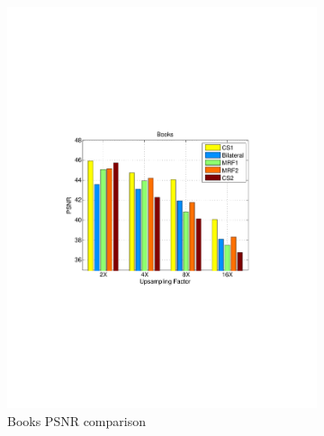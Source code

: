 \documentclass[preprint,10pt,5p,times,twocolumn]{elsarticle}
\begin{document}
\begin{figure}
\centering
\begin{subfigure}[b]{0.24\textwidth}
\includegraphics[width=\textwidth]{fig_exp1_books.pdf}
\caption*{Books PSNR comparison}
\end{subfigure}
\begin{subfigure}[b]{0.24\textwidth}

\end{subfigure}
\end{figure}
\end{document}
